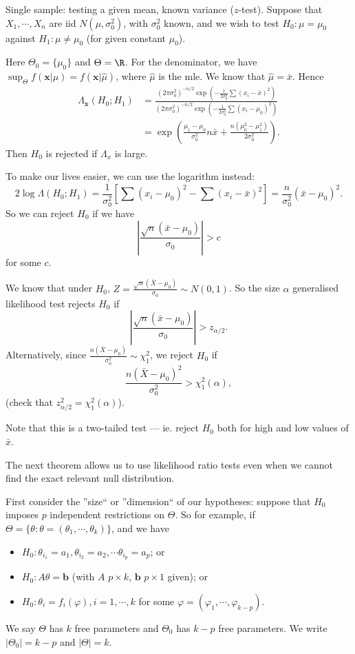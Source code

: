 \documentclass[a4paper]{article}
\begin{document}
\begin{eg}
  Single sample: testing a given mean, known variance ($z$-test). Suppose that $X_1, \cdots, X_n$ are iid $N(\mu, \sigma_0^2)$, with $\sigma_0^2$ known, and we wish to test $H_0: \mu = \mu_0$ against $H_1: \mu \not= \mu_0$ (for given constant $\mu_0$).

  Here $\Theta_0 = \{\mu_0\}$ and $\Theta = \R$.
  For the denominator, we have $\sup_\Theta f(\mathbf{x}|\mu) = f(\mathbf{x}|\hat{\mu})$, where $\hat{\mu}$ is the mle. We know that $\hat{\mu} = \bar x$. Hence
  \begin{align*}
    \Lambda_\mathbf{x}(H_0; H_1) &= \frac{(2\pi\sigma_0^2)^{-n/2}\exp\left(-\frac{1}{2\sigma^2_0}\sum(x_i - \bar x)^2\right)}{(2\pi\sigma_0^2)^{-n/2}\exp\left(-\frac{1}{2\sigma^2_0}\sum(x_i - \mu_0)^2\right)}\\
    &= \exp\left(\frac{\mu_1 - \mu_0}{\sigma_0^2}n\bar x + \frac{n(\mu_0^2 - \mu_1^2)}{2\sigma_0^2}\right).
  \end{align*}
  Then $H_0$ is rejected if $\Lambda_x$ is large.

  To make our lives easier, we can use the logarithm instead:
  \[
    2\log \Lambda(H_0;H_1) = \frac{1}{\sigma_0^2}\left[\sum (x_i - \mu_0)^2 - \sum (x_i - \bar x)^2\right] = \frac{n}{\sigma_0^2}(\bar x - \mu_0)^2.
  \]
  So we can reject $H_0$ if we have
  \[
    \left|\frac{\sqrt{n}(\bar x - \mu_0)}{\sigma_0}\right| > c
  \]
  for some $c$.

  We know that under $H_0$, $\displaystyle Z = \frac{\sqrt{n}(\bar X - \mu_0)}{\sigma_0}\sim N(0, 1)$. So the size $\alpha$ generalised likelihood test rejects $H_0$ if
  \[
    \left|\frac{\sqrt{n}(\bar x - \mu_0)}{\sigma_0}\right| > z_{\alpha/2}.
  \]
  Alternatively, since $\displaystyle \frac{n(\bar X - \mu_0)}{\sigma_0^2}\sim \chi_1^2$, we reject $H_0$ if
  \[
    \frac{n(\bar X - \mu_0)^2}{\sigma_0^2} > \chi_1^2(\alpha),
  \]
  (check that $z_{\alpha/2}^2 = \chi_1^2(\alpha)$).

  Note that this is a two-tailed test --- ie. reject $H_0$ both for high and low values of $\bar x$.
\end{eg}

The next theorem allows us to use likelihood ratio tests even when we cannot find the exact relevant null distribution.

First consider the ''size`` or ''dimension`` of our hypotheses: suppose that $H_0$ imposes $p$ independent restrictions on $\Theta$. So for example, if $\Theta = \{\theta: \theta = (\theta_1, \cdots, \theta_k)\}$, and we have
\begin{itemize}
  \item $H_0: \theta_{i_1} = a_1, \theta_{i_2} = a_2, \cdots \theta_{i_p} = a_p$; or
  \item $H_0: A\theta = \mathbf{b}$ (with $A$ $p\times k$, $\mathbf{b}$ $p\times 1$ given); or
  \item $H_0: \theta_i = f_i(\varphi), i = 1, \cdots, k$ for some $\varphi = (\varphi_1, \cdots, \varphi_{k - p})$.
\end{itemize}
We say $\Theta$ has $k$ free parameters and $\Theta_0$ has $k - p$ free parameters. We write $|\Theta_0| = k - p$ and $|\Theta| = k$.
\end{document}
